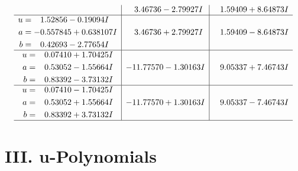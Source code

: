 \documentclass[1p]{elsarticle_modified}
\theoremstyle{definition}
\begin{document}
$$\begin{array}{c|c|c}
 & \phantom{-}3.46736 - 2.79927 I & \phantom{-}1.59409 + 8.64873 I \\ \hline\begin{aligned}
u &= \phantom{-}1.52856 - 0.19094 I \\
a &= -0.557845 + 0.638107 I \\
b &= \phantom{-}0.42693 - 2.77654 I\end{aligned}
 & \phantom{-}3.46736 + 2.79927 I & \phantom{-}1.59409 - 8.64873 I \\ \hline\begin{aligned}
u &= \phantom{-}0.07410 + 1.70425 I \\
a &= \phantom{-}0.53052 - 1.55664 I \\
b &= \phantom{-}0.83392 - 3.73132 I\end{aligned}
 & -11.77570 - 1.30163 I & \phantom{-}9.05337 + 7.46743 I \\ \hline\begin{aligned}
u &= \phantom{-}0.07410 - 1.70425 I \\
a &= \phantom{-}0.53052 + 1.55664 I \\
b &= \phantom{-}0.83392 + 3.73132 I\end{aligned}
 & -11.77570 + 1.30163 I & \phantom{-}9.05337 - 7.46743 I\\
 \hline 
 \end{array}$$\newpage
\newpage\renewcommand{\arraystretch}{1}
\centering \section*{ III. u-Polynomials}
\end{document}
